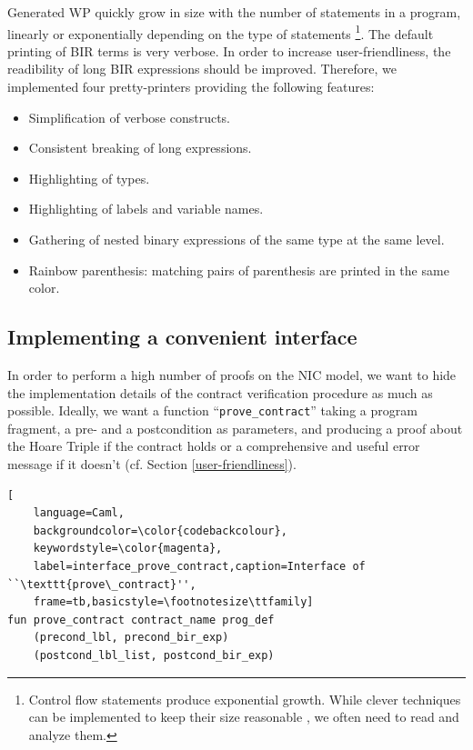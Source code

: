 \documentclass[10pt,a4paper]{article}
\begin{document}
\begin{multicols}{2}
Generated WP quickly grow in size with the number of statements in a program, linearly or exponentially depending on the type of statements \footnote{Control flow statements produce exponential growth. While clever techniques can be implemented to keep their size reasonable \cite{lindner_trabin:_2019}, we often need to read and analyze them.}. The default printing of BIR terms is very verbose. In order to increase user-friendliness, the readibility of long BIR expressions should be improved. Therefore, we implemented four pretty-printers providing the following features:

\begin{itemize}
    \item Simplification of verbose constructs.
    \item Consistent breaking of long expressions.
    \item Highlighting of types.
    \item Highlighting of labels and variable names.
    \item Gathering of nested binary expressions of the same type at the same level.
    \item Rainbow parenthesis: matching pairs of parenthesis are printed in the same color.
\end{itemize}

\subsection{Implementing a convenient interface} \label{impl_convenient_ht_interface}

In order to perform a high number of proofs on the {NIC} model, we want to hide the implementation details of the contract verification procedure as much as possible. Ideally, we want a function ``\texttt{prove\_contract}'' taking a program fragment, a pre- and a postcondition as parameters, and producing a proof about the Hoare Triple if the contract holds or a comprehensive and useful error message if it doesn't (cf. Section \ref{user-friendliness}).
%
\begin{lstlisting}[
    language=Caml,
    backgroundcolor=\color{codebackcolour},
    keywordstyle=\color{magenta},
    label=interface_prove_contract,caption=Interface of ``\texttt{prove\_contract}'',
    frame=tb,basicstyle=\footnotesize\ttfamily]
fun prove_contract contract_name prog_def
    (precond_lbl, precond_bir_exp)
    (postcond_lbl_list, postcond_bir_exp)
\end{lstlisting}


\end{multicols}
\end{document}
